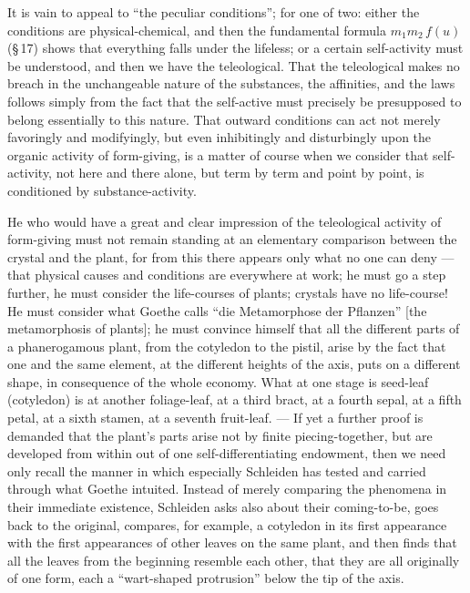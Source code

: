 \documentclass[12pt]{book}
\begin{document}
It is vain to appeal to ``the peculiar conditions''; for one of two: either the conditions
are physical-chemical, and then the fundamental formula $m_1 m_2\, f(u)$ (\S\,17) shows
that everything falls under the lifeless; or a certain self-activity must be understood,
and then we have the teleological. That the teleological makes no breach in the
unchangeable nature of the substances, the affinities, and the laws follows simply from
the fact that the self-active must precisely be presupposed to belong essentially to this
nature. That outward conditions can act not merely favoringly and modifyingly, but even
inhibitingly and disturbingly upon the organic activity of form-giving, is a matter of
course when we consider that self-activity, not here and there alone, but term by term and
point by point, is conditioned by substance-activity.

He who would have a great and clear impression of the teleological activity of
form-giving must not remain standing at an elementary comparison between the crystal and
the plant, for from this there appears only what no one can deny --- that physical causes
and conditions are everywhere at work; he must go a step further, he must consider the
life-courses of plants; crystals have no life-course! He must consider what Goethe calls
``die Metamorphose der Pflanzen'' [the metamorphosis of plants]; he must convince himself
that all the different parts of a phanerogamous plant, from the cotyledon to the pistil,
arise by the fact that one and the same element, at the different heights of the axis, puts
on a different shape, in consequence of the whole economy. What at one stage is seed-leaf
(cotyledon) is at another foliage-leaf, at a third bract, at a fourth sepal, at a fifth
petal, at a sixth stamen, at a seventh fruit-leaf. --- If yet a further proof is demanded
that the plant's parts arise not by finite piecing-together, but are developed from within
out of one self-differentiating endowment, then we need only recall the manner in which
especially Schleiden has tested and carried through what Goethe intuited. Instead of merely
comparing the phenomena in their immediate existence, Schleiden asks also about their
coming-to-be, goes back to the original, compares, for example, a cotyledon in its first
appearance with the first appearances of other leaves on the same plant, and then finds
that all the leaves from the beginning resemble each other, that they are all originally
of one form, each a ``wart-shaped protrusion'' below the tip of the axis.
\end{document}
